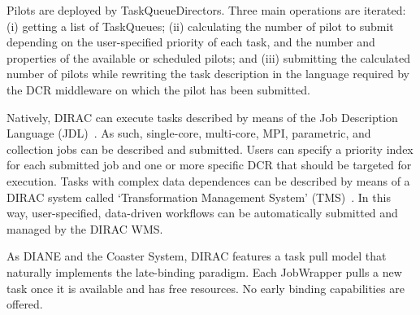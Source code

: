 \documentclass{sig-alternate}
\begin{document}
Pilots are deployed by TaskQueueDirectors. Three main operations are iterated:
(i) getting a list of TaskQueues; (ii) calculating the number of pilot to submit
depending on the user-specified priority of each task, and the number and
properties of the available or scheduled pilots; and (iii) submitting the
calculated number of pilots while rewriting the task description in the language
required by the DCR middleware on which the pilot has been submitted.

Natively, DIRAC can execute tasks described by means of the Job Description
Language (JDL)~\cite{pacini2006job}. As such, single-core, multi-core, MPI,
parametric, and collection jobs can be described and submitted. Users can
specify a priority index for each submitted job and one or more specific DCR
that should be targeted for execution. Tasks with complex data dependences can
be described by means of a DIRAC system called `Transformation Management
System' (TMS)~\cite{tsaregorodtsev2006dirac}. In this way, user-specified,
data-driven workflows can be automatically submitted and managed by the DIRAC
WMS.

As DIANE and the Coaster System, DIRAC features a task pull model that naturally
implements the late-binding paradigm. Each JobWrapper pulls a new task once it
is available and has free resources. No early binding capabilities are offered.

%




\end{document}
